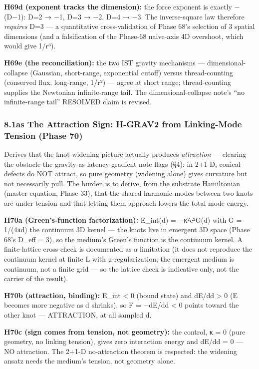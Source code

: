\documentclass[
]{article}
\begin{document}
\textbf{H69d (exponent tracks the dimension):} the force exponent is
exactly −(D−1): D=2 → −1, D=3 → −2, D=4 → −3. The inverse-square law
therefore \emph{requires} D=3 --- a quantitative cross-validation of
Phase 68's selection of 3 spatial dimensions (and a falsification of the
Phase-68 naive-axis 4D overshoot, which would give 1/r³).

\textbf{H69e (the reconciliation):} the two IST gravity mechanisms ---
dimensional-collapse (Gaussian, short-range, exponential cutoff) versus
thread-counting (conserved flux, long-range, 1/r²) --- agree at short
range; thread-counting supplies the Newtonian infinite-range tail. The
dimensional-collapse note's ``no infinite-range tail'' RESOLVED claim is
revised.

\subsubsection{8.1as The Attraction Sign: H-GRAV2 from Linking-Mode
Tension (Phase
70)}\label{as-the-attraction-sign-h-grav2-from-linking-mode-tension-phase-70}

Derives that the knot-widening picture actually produces
\emph{attraction} --- clearing the obstacle the
gravity-as-latency-gradient note flags (§4): in 2+1-D, conical defects
do NOT attract, so pure geometry (widening alone) gives curvature but
not necessarily pull. The burden is to derive, from the substrate
Hamiltonian (master equation, Phase 33), that the shared harmonic modes
between two knots are under tension and that letting them approach
lowers the total mode energy.

\textbf{H70a (Green's-function factorization):} E\_int(d) = −κ²c²G(d)
with G = 1/(4πd) the continuum 3D kernel --- the knots live in emergent
3D space (Phase 68's D\_eff = 3), so the medium's Green's function is
the continuum kernel. A finite-lattice cross-check is documented as a
limitation (it does not reproduce the continuum kernel at finite L with
μ-regularization; the emergent medium is continuum, not a finite grid
--- so the lattice check is indicative only, not the carrier of the
result).

\textbf{H70b (attraction, binding):} E\_int \textless{} 0 (bound state)
and dE/dd \textgreater{} 0 (E becomes more negative as d shrinks), so F
= −dE/dd \textless{} 0 points toward the other knot --- ATTRACTION, at
all sampled d.

\textbf{H70c (sign comes from tension, not geometry):} the control, κ =
0 (pure geometry, no linking tension), gives zero interaction energy and
dE/dd = 0 --- NO attraction. The 2+1-D no-attraction theorem is
respected: the widening ansatz needs the medium's tension, not geometry
alone.
\end{document}
